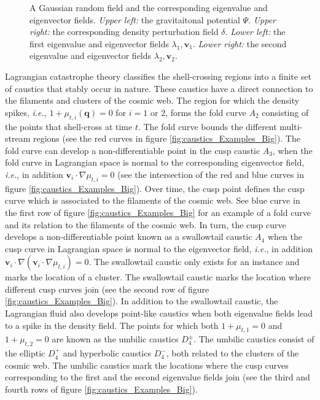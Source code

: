 \documentclass[a4paper, 11pt]{article}
\begin{document}
\begin{figure}
\begin{subfigure}[b]{0.49\textwidth}
\end{subfigure}
\caption{A Gaussian random field and the corresponding eigenvalue and eigenvector fields. \textit{Upper left:} the gravitaitonal potential $\Psi$. \textit{Upper right:} the corresponding density perturbation field $\delta$. \textit{Lower left:} the first eigenvalue and eigenvector fields $\lambda_1,\bm{v}_1$. \textit{Lower right:} the second eigenvalue and eigenvector fields $\lambda_2,\bm{v}_2$.}\label{fig:Initial_Conditions}
\end{figure}

Lagrangian catastrophe theory classifies the shell-crossing regions into a finite set of caustics that stably occur in nature. These caustics have a direct connection to the filaments and clusters of the cosmic web. The region for which the density spikes, \textit{i.e.}, $1+\mu_{t,i}(\bm{q})=0$ for $i=1$ or $2$, forms the fold curve $A_2$ consisting of the points that shell-cross at time $t$. The fold curve bounds the different multi-stream regions (see the red curves in figure \ref{fig:caustics_Examples_Big}). The fold curve can develop a non-differentiable point in the cusp caustic $A_3$, when the fold curve in Lagrangian space is normal to the corresponding eigenvector field, \textit{i.e.}, in addition $\bm{v}_i \cdot \nabla \mu_{t,i}=0$ (see the intersection of the red and blue curves in figure \ref{fig:caustics_Examples_Big}). Over time, the cusp point defines the cusp curve which is associated to the filaments of the cosmic web. See blue curve in the first row of figure \ref{fig:caustics_Examples_Big} for an example of a fold curve and its relation to the filaments of the cosmic web. In turn, the cusp curve develops a non-differentiable point known as a swallowtail caustic $A_4$ when the cusp curve in Lagrangian space is normal to the eigenvector field, \textit{i.e.}, in addition $\bm{v}_i \cdot \nabla (\bm{v}_i \cdot \nabla \mu_{t,i}) = 0$. The swallowtail caustic only exists for an instance and marks the location of a cluster. The swallowtail caustic marks the location where different cusp curves join (see the second row of figure \ref{fig:caustics_Examples_Big}). In addition to the swallowtail caustic, the Lagrangian fluid also develops point-like caustics when both eigenvalue fields lead to a spike in the density field. The points for which both $1+\mu_{t,1}=0$ and $1+\mu_{t,2} = 0$ are known as the umbilic caustics $D_4^\pm$. The umbilic caustics consist of the elliptic $D_4^+$ and hyperbolic caustics $D_4^-$, both related to the clusters of the cosmic web. The umbilic caustics mark the locations where the cusp curves corresponding to the first and the second eigenvalue fields join (see the third and fourth rows of figure \ref{fig:caustics_Examples_Big}). 
\end{document}
